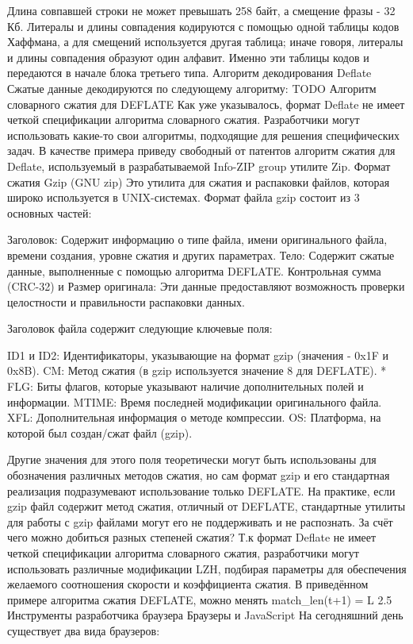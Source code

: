 \documentclass[12pt]{article}
\begin{document}
    Длина совпавшей строки не может превышать 258 байт, а смещение фразы - 32 Кб. Литералы и длины совпадения кодируются с помощью одной таблицы кодов Хаффмана, а для смещений используется другая таблица; иначе говоря, литералы и длины совпадения образуют один алфавит. Именно эти таблицы кодов и передаются в начале блока третьего типа.
    Алгоритм декодирования Deflate
    Сжатые данные декодируются по следующему алгоритму:
    TODO
    Алгоритм словарного сжатия для DEFLATE
    Как уже указывалось, формат Deflate не имеет четкой спецификации алгоритма словарного сжатия. Разработчики могут использовать какие-то свои алгоритмы, подходящие для решения специфических задач.
    В качестве примера приведу свободный от патентов алгоритм сжатия для Deflate, используемый в разрабатываемой Info-ZIP group утилите Zip.
    Формат сжатия Gzip (GNU zip)
    Это утилита для сжатия и распаковки файлов, которая широко используется в UNIX-системах.
    Формат файла gzip состоит из 3 основных частей:

    Заголовок: Содержит информацию о типе файла, имени оригинального файла, времени создания, уровне сжатия и других параметрах.
    Тело: Содержит сжатые данные, выполненные с помощью алгоритма DEFLATE.
    Контрольная сумма (CRC-32) и Размер оригинала: Эти данные предоставляют возможность проверки целостности и правильности распаковки данных.

    Заголовок файла содержит следующие ключевые поля:

    ID1 и ID2: Идентификаторы, указывающие на формат gzip (значения - 0x1F и 0x8B).
    CM: Метод сжатия (в gzip используется значение 8 для DEFLATE). *
    FLG: Биты флагов, которые указывают наличие дополнительных полей и информации.
    MTIME: Время последней модификации оригинального файла.
    XFL: Дополнительная информация о методе компрессии.
    OS: Платформа, на которой был создан/сжат файл (gzip).

    Другие значения для этого поля теоретически могут быть использованы для обозначения различных методов сжатия, но сам формат gzip и его стандартная реализация подразумевают использование только DEFLATE. На практике, если gzip файл содержит метод сжатия, отличный от DEFLATE, стандартные утилиты для работы с gzip файлами могут его не поддерживать и не распознать.
    За счёт чего можно добиться разных степеней сжатия?
    Т.к формат Deflate не имеет четкой спецификации алгоритма словарного сжатия, разработчики могут использовать различные модификации LZH, подбирая параметры для обеспечения желаемого соотношения скорости и коэффициента сжатия.
    В приведённом примере алгоритма сжатия DEFLATE, можно менять match_len(t+1) = L
    2.5 Инструменты разработчика браузера
    Браузеры и JavaScript
    На сегодняшний день существует два вида браузеров:
\end{document}
